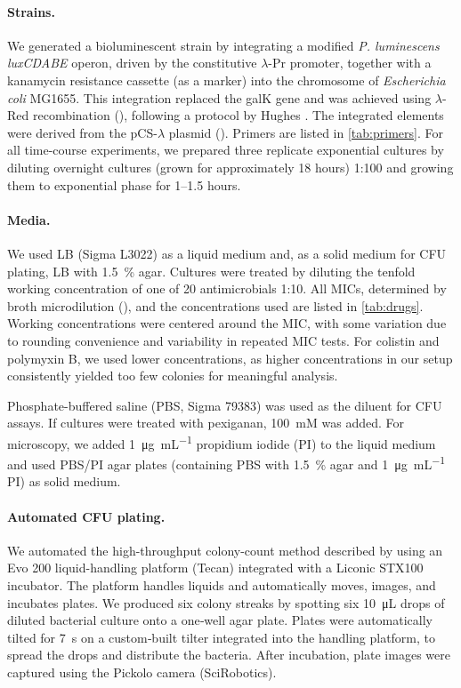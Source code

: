 \paragraph{Strains.}
We generated a bioluminescent strain by integrating a modified \textit{P. luminescens luxCDABE} operon, driven by the constitutive $\lambda$-Pr promoter, together with a kanamycin resistance cassette (as a marker) into the chromosome of \textit{Escherichia coli} MG1655.
This integration replaced the galK gene and was achieved using $\lambda$-Red recombination (\cite{Datsenko2000}), following a protocol by Hughes \cite[19--26]{Hughes2015}.
The integrated elements were derived from the pCS-$\lambda$ plasmid (\cite{Kishony2003, Bjarnason2003}).
Primers are listed in \autoref{tab:primers}.
For all time-course experiments, we prepared three replicate exponential cultures by diluting overnight cultures (grown for approximately 18 hours) 1:100 and growing them to exponential phase for 1--1.5 hours.

\paragraph{Media.}
We used LB (Sigma L3022) as a liquid medium and, as a solid medium for CFU plating, LB with \SI{1.5}{\percent} agar.
Cultures were treated by diluting the tenfold working concentration of one of 20 antimicrobials 1:10.
All MICs, determined by broth microdilution (\cite{EUCAST2025}), and the concentrations used are listed in \autoref{tab:drugs}.
Working concentrations were centered around the MIC, with some variation due to rounding convenience and variability in repeated MIC tests.
For colistin and polymyxin B, we used lower concentrations, as higher concentrations in our setup consistently yielded too few colonies for meaningful analysis.

Phosphate-buffered saline (PBS, Sigma 79383) was used as the diluent for CFU assays.
If cultures were treated with pexiganan, \SI{100}{\milli M}  was added.
For microscopy, we added \SI{1}{\micro\gram\per\milli\liter} propidium iodide (PI) to the liquid medium and used PBS/PI agar plates (containing PBS with \SI{1.5}{\percent} agar and \SI{1}{\micro\gram\per\milli\liter} PI) as solid medium.

\paragraph{Automated CFU plating.}
We automated the high-throughput colony-count method described by \cite{Jett1997} using an Evo 200 liquid-handling platform (Tecan) integrated with a Liconic STX100 incubator.
The platform handles liquids and automatically moves, images, and incubates plates.
We produced six colony streaks by spotting six \SI{10}{\micro\liter} drops of diluted bacterial culture onto a one‑well agar plate.
Plates were automatically tilted for \SI{7}{\second} on a custom‑built tilter integrated into the handling platform, to spread the drops and distribute the bacteria.
After incubation, plate images were captured using the Pickolo camera (SciRobotics).

